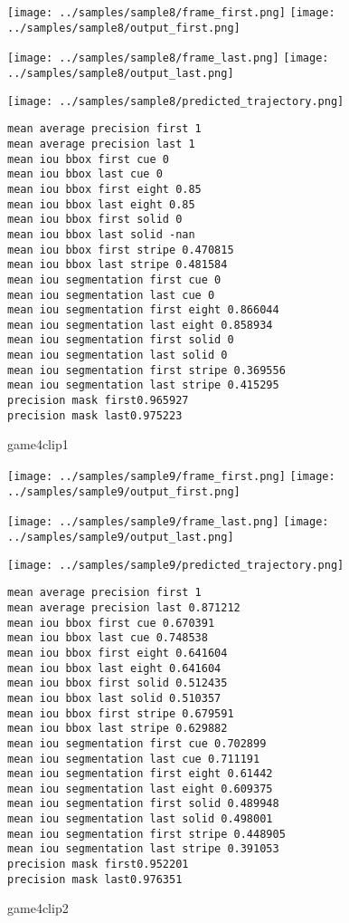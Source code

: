 \begin{figure}
\texttt{[image: ../samples/sample8/frame\_first.png]}
\texttt{[image: ../samples/sample8/output\_first.png]}\par
\texttt{[image: ../samples/sample8/frame\_last.png]}
\texttt{[image: ../samples/sample8/output\_last.png]}\par
\texttt{[image: ../samples/sample8/predicted\_trajectory.png]}
\caption{game4clip1}
\begin{verbatim}
mean average precision first 1
mean average precision last 1
mean iou bbox first cue 0
mean iou bbox last cue 0
mean iou bbox first eight 0.85
mean iou bbox last eight 0.85
mean iou bbox first solid 0
mean iou bbox last solid -nan
mean iou bbox first stripe 0.470815
mean iou bbox last stripe 0.481584
mean iou segmentation first cue 0
mean iou segmentation last cue 0
mean iou segmentation first eight 0.866044
mean iou segmentation last eight 0.858934
mean iou segmentation first solid 0
mean iou segmentation last solid 0
mean iou segmentation first stripe 0.369556
mean iou segmentation last stripe 0.415295
precision mask first0.965927
precision mask last0.975223
\end{verbatim}
\end{figure}

\begin{figure}
\texttt{[image: ../samples/sample9/frame\_first.png]}
\texttt{[image: ../samples/sample9/output\_first.png]}\par
\texttt{[image: ../samples/sample9/frame\_last.png]}
\texttt{[image: ../samples/sample9/output\_last.png]}\par
\texttt{[image: ../samples/sample9/predicted\_trajectory.png]}
\caption{game4clip2}
\begin{verbatim}
mean average precision first 1
mean average precision last 0.871212
mean iou bbox first cue 0.670391
mean iou bbox last cue 0.748538
mean iou bbox first eight 0.641604
mean iou bbox last eight 0.641604
mean iou bbox first solid 0.512435
mean iou bbox last solid 0.510357
mean iou bbox first stripe 0.679591
mean iou bbox last stripe 0.629882
mean iou segmentation first cue 0.702899
mean iou segmentation last cue 0.711191
mean iou segmentation first eight 0.61442
mean iou segmentation last eight 0.609375
mean iou segmentation first solid 0.489948
mean iou segmentation last solid 0.498001
mean iou segmentation first stripe 0.448905
mean iou segmentation last stripe 0.391053
precision mask first0.952201
precision mask last0.976351
\end{verbatim}
\end{figure}
